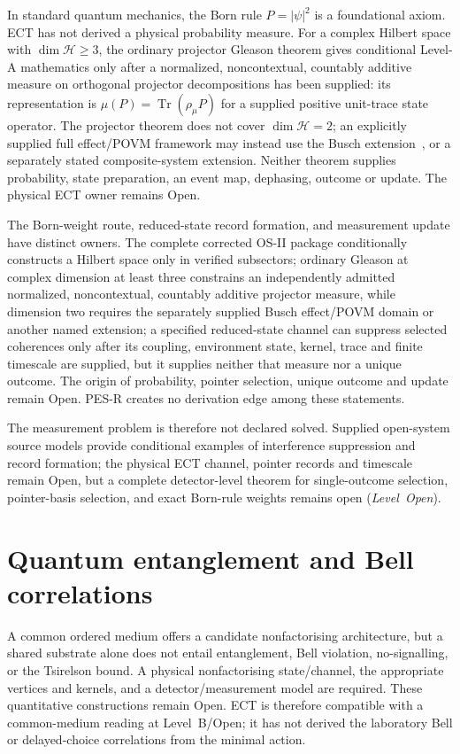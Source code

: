 \documentclass[11pt,a4paper]{article}
\begin{document}
In standard quantum mechanics, the Born rule $P=|\psi|^2$ is a foundational axiom.  ECT has not derived a physical probability measure.  For a complex Hilbert space with $\dim\mathcal H\ge3$, the ordinary projector Gleason theorem gives conditional Level-A mathematics only after a normalized, noncontextual, countably additive measure on orthogonal projector decompositions has been supplied: its representation is $\mu(P)=\operatorname{Tr}(\rho_\mu P)$ for a supplied positive unit-trace state operator.  The projector theorem does not cover $\dim\mathcal H=2$; an explicitly supplied full effect/POVM framework may instead use the Busch extension~\cite{Busch2003Gleason}, or a separately stated composite-system extension.  Neither theorem supplies probability, state preparation, an event map, dephasing, outcome or update.  The physical ECT owner remains Open.

The Born-weight route, reduced-state record formation, and measurement
update have distinct owners.  The complete corrected OS-II package conditionally constructs a Hilbert space only in verified subsectors; ordinary Gleason at complex dimension at least three constrains an independently admitted normalized, noncontextual, countably additive projector measure, while dimension two requires the separately supplied Busch effect/POVM domain or another named extension; a specified reduced-state channel can suppress selected coherences only after its coupling, environment state, kernel, trace and finite timescale are supplied, but it supplies
neither that measure nor a unique outcome.  The origin of probability,
pointer selection, unique outcome and update remain Open.  PES-R creates no
derivation edge among these statements.

The measurement problem is therefore not declared solved. Supplied open-system source models provide conditional examples of interference suppression and record formation; the physical ECT channel, pointer records and timescale remain Open, but a complete detector-level theorem for single-outcome selection, pointer-basis selection, and exact Born-rule weights remains open (\emph{Level~Open}).


\section{Quantum entanglement and Bell correlations}
\label{sec:pop_entanglement}

A common ordered medium offers a candidate nonfactorising architecture, but a
shared substrate alone does not entail entanglement, Bell violation,
no-signalling, or the Tsirelson bound.  A physical nonfactorising state/channel,
the appropriate vertices and kernels, and a detector/measurement model are
required.  These quantitative constructions remain Open.  ECT is therefore
compatible with a common-medium reading at Level~B/Open; it has not derived the
laboratory Bell or delayed-choice correlations from the minimal action.
\end{document}
